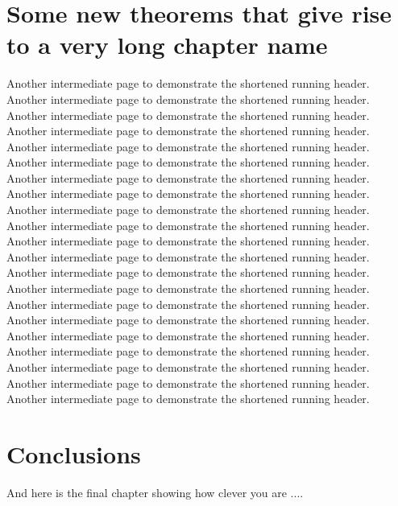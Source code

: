 \documentclass[12pt,MSc]{muthesis}
\begin{document}
\chapter{Some new theorems that give rise to a very long chapter name}
Another intermediate page to demonstrate the shortened running header.
Another intermediate page to demonstrate the shortened running header.
Another intermediate page to demonstrate the shortened running header.
Another intermediate page to demonstrate the shortened running header.
Another intermediate page to demonstrate the shortened running header.
Another intermediate page to demonstrate the shortened running header.
Another intermediate page to demonstrate the shortened running header.
Another intermediate page to demonstrate the shortened running header.
Another intermediate page to demonstrate the shortened running header.
Another intermediate page to demonstrate the shortened running header.
Another intermediate page to demonstrate the shortened running header.
Another intermediate page to demonstrate the shortened running header.
Another intermediate page to demonstrate the shortened running header.
Another intermediate page to demonstrate the shortened running header.
Another intermediate page to demonstrate the shortened running header.
Another intermediate page to demonstrate the shortened running header.
Another intermediate page to demonstrate the shortened running header.
Another intermediate page to demonstrate the shortened running header.
Another intermediate page to demonstrate the shortened running header.
Another intermediate page to demonstrate the shortened running header.
Another intermediate page to demonstrate the shortened running header.


\chapter{Conclusions}
And here is the final chapter showing how clever you are ....






\end{document}
